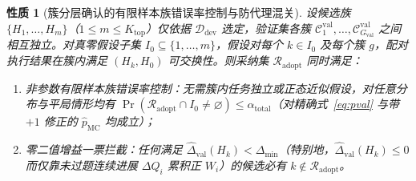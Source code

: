 \documentclass[UTF8,a4paper,10.5pt]{ctexart}
\newtheorem{prop}{性质}
\newcommand{\Ddev}{\mathcal{D}_{\mathrm{dev}}}
\begin{document}
\begin{prop}[簇分层确认的有限样本族错误率控制与防代理混关]
\label{prop:fwer}
设候选族 $\{H_1,\dots,H_m\}$（$1\le m\le K_{\mathrm{top}}$）仅依据 $\Ddev$ 选定，验证集各簇 $\mathcal{C}^{\mathrm{val}}_1,\dots,\mathcal{C}^{\mathrm{val}}_{G_{\mathrm{val}}}$ 之间相互独立。对真零假设子集 $I_0\subseteq\{1,\dots,m\}$，假设对每个 $k\in I_0$ 及每个簇 $g$，配对执行结果在簇内满足 $(H_k,H_0)$ 可交换性。则采纳集 $\mathcal{R}_{\mathrm{adopt}}$ 同时满足：
\begin{enumerate}
  \item \emph{非参数有限样本族错误率控制}：无需簇内任务独立或正态近似假设，对任意分布与平局情形均有 $\Pr(\mathcal{R}_{\mathrm{adopt}}\cap I_0\neq\varnothing)\le\alpha_{\mathrm{total}}$（对精确式~\eqref{eq:pval} 与带 $+1$ 修正的 $\hat{p}_{\mathrm{MC}}$ 均成立）；
  \item \emph{零二值增益一票拦截}：任何满足 $\hat{\Delta}_{\mathrm{val}}(H_k)<\Delta_{\min}$（特别地，$\hat{\Delta}_{\mathrm{val}}(H_k)\le 0$ 而仅靠未过题连续进展 $\Delta Q_i$ 累积正 $W_i$）的候选必有 $k\notin\mathcal{R}_{\mathrm{adopt}}$。
\end{enumerate}
\end{prop}
\end{document}

